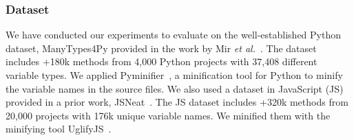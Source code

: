 

\subsubsection*{Dataset} We have conducted our experiments to evaluate {\tool} on the
well-established Python dataset, ManyTypes4Py provided in the work
by Mir {\em et al.}~\cite{mir2021manytypes4py}. The dataset includes
+180k methods from 4,000 Python projects with 37,408 different
variable types. We applied Pyminifier~\cite{pyminifier}, a
minification tool for Python to minify the variable names in the
source files.
We also used a dataset in JavaScript (JS) provided in a prior work,
JSNeat~\cite{icse19}. The JS dataset includes +320k methods from
20,000 projects with 176k unique variable names. We minified them with
the minifying tool UglifyJS~\cite{uglify}.

